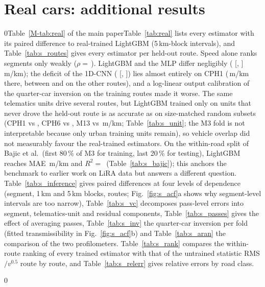 \documentclass[onecolumn,10pt]{IEEEtran}
\providecommand{\tenpage}{0}
\newcommand{\ifmainten}[2]{\if1\tenpage #1\else #2\fi}
\newcommand{\TabReal}{\ifmainten{Table~\ref{M-tab:real} of the main paper}{Table~\ref{tab:real}}}
\begin{document}
\section{Real cars: additional results}
\label{sec:s_real}
\TabReal{} lists every estimator with its paired difference to real-trained LightGBM (5\,km-block intervals), and Table~\ref{tab:s_routes} gives every estimator per held-out route.
Speed alone ranks segments only weakly ($\rho=$\,\vrSpeedRhoWithin).
LightGBM and the MLP differ negligibly (\vrMlpDfive{} [\vrMlpDfiveLo, \vrMlpDfiveHi]\,m/km); the deficit of the 1D-CNN (\vrCnnDfive{} [\vrCnnDfiveLo, \vrCnnDfiveHi]) lies almost entirely on CPH1 (\vrCnnDeficitCphOne\,m/km there, between \vrCnnDeficitCphSix{} and \vrCnnDeficitMwThree{} on the other routes), and a log-linear output calibration of the quarter-car inversion on the training routes made it worse.
The same telematics units drive several routes, but LightGBM trained only on units that never drove the held-out route is as accurate as on size-matched random subsets (CPH1 \udCphOneDis{} vs \udCphOneCtrl, CPH6 \udCphSixDis{} vs \udCphSixCtrl, M13 \udMwThirteenDis{} vs \udMwThirteenCtrl\,m/km; Table~\ref{tab:s_unit}; the M3 fold is not interpretable because only urban training units remain), so vehicle overlap did not measurably favour the real-trained estimators.
On the within-road split of Bajic et al.\ (first 80\,\% of M3 for training, last 20\,\% for testing), LightGBM reaches MAE \bjGbmMae\,m/km and $R^2=$\,\bjGbmRtwo{} (Table~\ref{tab:s_bajic}); this anchors the benchmark to earlier work on LiRA data but answers a different question.
Table~\ref{tab:s_inference} gives paired differences at four levels of dependence (segment, 1\,km and 5\,km blocks, routes; Fig.~\ref{fig:s_acf}a shows why segment-level intervals are too narrow), Table~\ref{tab:s_vc} decomposes pass-level errors into segment, telematics-unit and residual components, Table~\ref{tab:s_passes} gives the effect of averaging passes, Table~\ref{tab:s_inv} the quarter-car inversion per fold (fitted transmissibility in Fig.~\ref{fig:s_acf}b) and Table~\ref{tab:s_aran} the comparison of the two profilometers.
Table~\ref{tab:s_rank} compares the within-route ranking of every trained estimator with that of the untrained statistic RMS$/v^{0.5}$ route by route, and Table~\ref{tab:s_relerr} gives relative errors by road class.

\tenpage\else\fi




\end{document}
